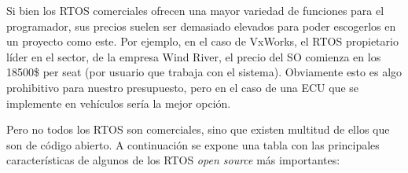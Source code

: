 Si bien los RTOS comerciales ofrecen una mayor variedad de funciones para el programador, sus precios suelen ser demasiado elevados para poder escogerlos en un proyecto como este. Por ejemplo, en el caso de VxWorks, el RTOS propietario líder en el sector, de la empresa Wind River, el precio del SO comienza en los 18500\$ per seat (por usuario que trabaja con el sistema). Obviamente esto es algo prohibitivo para nuestro presupuesto, pero en el caso de una ECU que se implemente en vehículos sería la mejor opción.\newline

Pero no todos los RTOS son comerciales, sino que existen multitud de ellos que son de código abierto. A continuación se expone una tabla con las principales características de algunos de los RTOS \textit{open source} más importantes:

